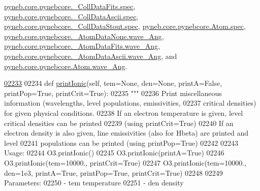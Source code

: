 \hyperlink{pynebcore_8py_source_l00578}{pyneb.\-core.\-pynebcore.\-\_\-\-Coll\-Data\-Fits.\-spec}, \hyperlink{pynebcore_8py_source_l00928}{pyneb.\-core.\-pynebcore.\-\_\-\-Coll\-Data\-Ascii.\-spec}, \hyperlink{pynebcore_8py_source_l01164}{pyneb.\-core.\-pynebcore.\-\_\-\-Coll\-Data\-Stout.\-spec}, \hyperlink{pynebcore_8py_source_l01220}{pyneb.\-core.\-pynebcore.\-Atom.\-spec}, \hyperlink{pynebcore_8py_source_l00064}{pyneb.\-core.\-pynebcore.\-\_\-\-Atom\-Data\-None.\-wave\-\_\-\-Ang}, \hyperlink{pynebcore_8py_source_l00172}{pyneb.\-core.\-pynebcore.\-\_\-\-Atom\-Data\-Fits.\-wave\-\_\-\-Ang}, \hyperlink{pynebcore_8py_source_l00438}{pyneb.\-core.\-pynebcore.\-\_\-\-Atom\-Data\-Ascii.\-wave\-\_\-\-Ang}, and \hyperlink{pynebcore_8py_source_l01254}{pyneb.\-core.\-pynebcore.\-Atom.\-wave\-\_\-\-Ang}.


\begin{DoxyCode}
\hypertarget{classpyneb_1_1core_1_1pynebcore_1_1_atom_l02233}{}\hyperlink{classpyneb_1_1core_1_1pynebcore_1_1_atom_a4be768ed1460bb448207b470551ef2ed}{02233} 
02234     \textcolor{keyword}{def }\hyperlink{classpyneb_1_1core_1_1pynebcore_1_1_atom_a4be768ed1460bb448207b470551ef2ed}{printIonic}(self, tem=None, den=None, printA=False, printPop=True, printCrit=True):
02235         \textcolor{stringliteral}{""" }
02236 \textcolor{stringliteral}{        Print miscellaneous information (wavelengths, level populations, emissivities, }
02237 \textcolor{stringliteral}{            critical densities) for given physical conditions.}
02238 \textcolor{stringliteral}{        If an electron temperature is given, level critical densities can be printed }
02239 \textcolor{stringliteral}{            (using printCrit=True)}
02240 \textcolor{stringliteral}{        If an electron density is also given, line emissivities (also for Hbeta) are printed and level }
02241 \textcolor{stringliteral}{            populations can be printed (using printPop=True)}
02242 \textcolor{stringliteral}{        }
02243 \textcolor{stringliteral}{        Usage:}
02244 \textcolor{stringliteral}{            O3.printIonic()}
02245 \textcolor{stringliteral}{            O3.printIonic(printA=True)}
02246 \textcolor{stringliteral}{            O3.printIonic(tem=10000., printCrit=True)}
02247 \textcolor{stringliteral}{            O3.printIonic(tem=10000., den=1e3, printA=True, printPop=True, printCrit=True)}
02248 \textcolor{stringliteral}{}
02249 \textcolor{stringliteral}{        Parameters:}
02250 \textcolor{stringliteral}{            - tem          temperature}
02251 \textcolor{stringliteral}{            - den          density}

\end{DoxyCode}
